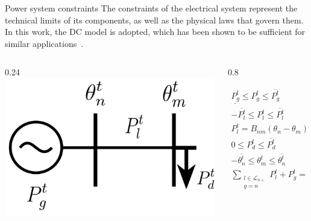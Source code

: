 \documentclass[hyperref={colorlinks,citecolor=blue,linkcolor=blue,urlcolor=blue}]{beamer}
\begin{document}
\begin{frame}{Power system constraints}
\footnotesize
The constraints of the electrical system represent the technical limits of its components, as well as the physical laws that govern them. In this work, the DC model is adopted, which has been shown to be sufficient for similar applications~\cite{8468081}.
\begin{columns}
\begin{column}{0.24\textwidth}
\vspace{3pt}
    \includegraphics[width=1.4\textwidth]{figures/power_dummy_constraint.png}
\end{column}
\begin{column}{0.8\textwidth}  %


\begin{subequations}
\begin{alignat}{2}
    \underline{P_g^t} \leq P_{g}^t \leq \overline{P_g^t} &\quad &\forall \ g \in \mathcal{G}, \label{eq:gen_limits} \\
    -\overline{P_l^t} \leq P_{l}^t \leq \overline{P_l^t} &\quad &\forall \ l \in \mathcal{L}, \label{eq:line_limits} \\
    P_{l}^t = B_{nm}(\theta_n - \theta_{m}) &\quad &\forall \ l = (n, m) \in \mathcal{L}, \label{eq:dc_power_flow} \\
    0 \leq P_{d}^t \leq \overline{P_{d}^t} &\quad &\forall \ d \in \mathcal{D}, \label{eq:dem_limit_power} \\
    -\overline{\theta_{n}^t} \leq \theta_{m}^t \leq \overline{\theta_{n}^t} &\quad &\forall \ n \in \mathcal{N}_P, \label{eq:voltage_angle_limits} \\
    \sum_{\substack{l\in \mathcal{L}_{n+}\\g=n}}{P_{l}^t + P_{g}^t} = \sum_{\substack{l\in \mathcal{L}_{n-}\\d=n}} P_{l}^t + P_{d}^t &\quad &\forall \ n \in \mathcal{N}_P \label{eq:power_balance}
\end{alignat}
\end{subequations}
\end{column}
\end{columns}


\end{frame}
\end{document}
